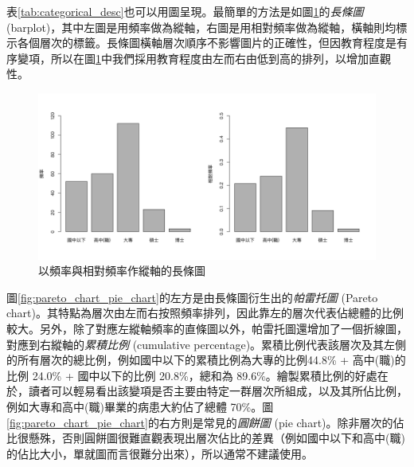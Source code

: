     表\ref{tab:categorical_desc}也可以用圖呈現。最簡單的方法是如圖\ref{fig:barplot}的\textit{長條圖} (barplot)，其中左圖是用頻率做為縱軸，右圖是用相對頻率做為縱軸，橫軸則均標示各個層次的標籤。長條圖橫軸層次順序不影響圖片的正確性，但因教育程度是有序變項，所以在圖\ref{fig:barplot}中我們採用教育程度由左而右由低到高的排列，以增加直觀性。
    
    \begin{figure}[htbp]
      \centering
      \includegraphics[width=\textwidth]{figures/02-Descriptive_statistics/barplot.png}
      \caption{以頻率與相對頻率作縱軸的長條圖}
      \label{fig:barplot}
    \end{figure}

    圖\ref{fig:pareto_chart_pie_chart}的左方是由長條圖衍生出的\textit{帕雷托圖} (Pareto chart)。其特點為層次由左而右按照頻率排列，因此靠左的層次代表佔總體的比例較大。另外，除了對應左縱軸頻率的直條圖以外，帕雷托圖還增加了一個折線圖，對應到右縱軸的\textit{累積比例} (cumulative percentage)。累積比例代表該層次及其左側的所有層次的總比例，例如國中以下的累積比例為大專的比例44.8\% + 高中(職)的比例 24.0\% + 國中以下的比例 20.8\%，總和為 89.6\%。繪製累積比例的好處在於，讀者可以輕易看出該變項是否主要由特定一群層次所組成，以及其所佔比例，例如大專和高中(職)畢業的病患大約佔了總體 70\%。圖\ref{fig:pareto_chart_pie_chart}的右方則是常見的\textit{圓餅圖} (pie chart)。除非層次的佔比很懸殊，否則圓餅圖很難直觀表現出層次佔比的差異（例如國中以下和高中(職)的佔比大小，單就圖而言很難分出來），所以通常不建議使用。\;\;\;\;\;\;\phantom{X}

